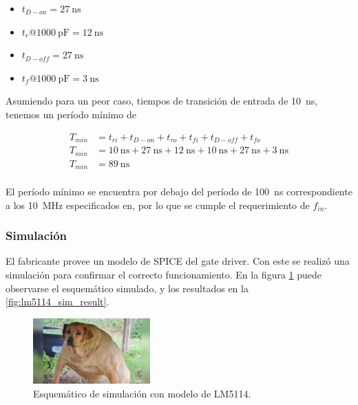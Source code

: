 \begin{itemize}
    \item $t_{D-on} = \qty{27}{\nano\second}$
    \item $t_{r} @ \qty{1000}{\pico\farad} = \qty{12}{\nano\second}$
    \item $t_{D-off} = \qty{27}{\nano\second}$
    \item $t_{f} @ \qty{1000}{\pico\farad} = \qty{3}{\nano\second}$
\end{itemize}

Asumiendo para un peor caso, tiempos de transición de entrada de
\qty{10}{\nano\second},  tenemos un período mínimo de

\begin{equation}
    \begin{aligned}
        T_{min} &= t_{ri} + t_{D-on} + t_{ro} + t_{fi} + t_{D-off} + t_{fo} \\
        T_{min} &= \qty{10}{\nano\second} + \qty{27}{\nano\second} +
        \qty{12}{\nano\second} + \qty{10}{\nano\second} + \qty{27}{\nano\second}
        + \qty{3}{\nano\second} \\
        T_{min} &= \qty{89}{\nano\second} \\
    \end{aligned}
\end{equation}

El período mínimo se encuentra por debajo del período de \qty{100}{\nano\second}
correspondiente a los \qty{10}{\mega\hertz} especificados en, por lo que se
cumple el requerimiento de $f_{in}$.

\subsubsection{Simulación}

El fabricante provee un modelo de SPICE del gate driver. Con este se realizó una
simulación para confirmar el correcto funcionamiento. En la figura
\ref{fig:lm5114_sim_sch} puede observarse el esquemático simulado, y los
resultados en la \ref{fig:lm5114_sim_result}.

\begin{figure}[tbp]
    \centering
    \includegraphics[width=0.4\textwidth]{images/placeholder.jpg}
    \caption{Esquemático de simulación con modelo de LM5114.}
    \label{fig:lm5114_sim_sch}
\end{figure}

